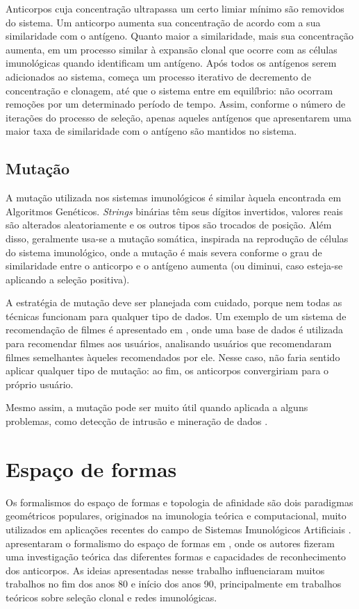 Anticorpos cuja concentração ultrapassa um certo limiar mínimo são removidos do sistema. Um anticorpo aumenta sua concentração de acordo com a sua similaridade com o antígeno. Quanto maior a similaridade, mais sua concentração aumenta, em um processo similar à expansão clonal que ocorre com as células imunológicas quando identificam um antígeno. Após todos os antígenos serem adicionados ao sistema, começa um processo iterativo de decremento de concentração e clonagem, até que o sistema entre em equilíbrio: não ocorram remoções por um determinado período de tempo. Assim, conforme o número de iterações do processo de seleção, apenas aqueles antígenos que apresentarem uma maior taxa de similaridade com o antígeno são mantidos no sistema.

\subsection{Mutação}

A mutação utilizada nos sistemas imunológicos é similar àquela encontrada em Algoritmos Genéticos. \emph{Strings} binárias têm seus dígitos invertidos, valores reais são alterados aleatoriamente e os outros tipos são trocados de posição. Além disso, geralmente usa-se a mutação somática, inspirada na reprodução de células do sistema imunológico, onde a mutação é mais severa conforme o grau de similaridade entre o anticorpo e o antígeno aumenta (ou diminui, caso esteja-se aplicando a seleção positiva).

A estratégia de mutação deve ser planejada com cuidado, porque nem todas as técnicas funcionam para qualquer tipo de dados. Um exemplo de um sistema de recomendação de filmes é apresentado em \citet{Aickelin2005}, onde uma base de dados é utilizada para recomendar filmes aos usuários, analisando usuários que recomendaram filmes semelhantes àqueles recomendados por ele. Nesse caso, não faria sentido aplicar qualquer tipo de mutação: ao fim, os anticorpos convergiriam para o próprio usuário.

Mesmo assim, a mutação pode ser muito útil quando aplicada a alguns problemas, como detecção de intrusão e mineração de dados \cite{DeCastro2002}.

\section{Espaço de formas}
\label{sec:ais_shape}

Os formalismos do espaço de formas e topologia de afinidade são dois paradigmas geométricos populares, originados na imunologia teórica e computacional, muito utilizados em aplicações recentes do campo de Sistemas Imunológicos Artificiais \cite{Brownlee2007}. \citeauthor{Perelson1979} apresentaram o formalismo do espaço de formas em \citet{Perelson1979}, onde os autores fizeram uma investigação teórica das diferentes formas e capacidades de reconhecimento dos anticorpos. As ideias apresentadas nesse trabalho influenciaram muitos trabalhos no fim dos anos 80 e início dos anos 90, principalmente em trabalhos teóricos sobre seleção clonal e redes imunológicas.

